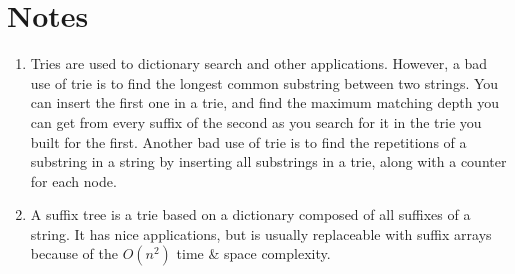 \documentclass[12pt]{book}
\begin{document}
\section{Notes}
\begin{enumerate}[label = \roman*.]
\item Tries are used to dictionary search and other applications. However, a bad use of trie is to find the longest common substring between two strings. You can insert the first one in a trie, and find the maximum matching depth you can get from every suffix of the second as you search for it in the trie you built for the first. Another bad use of trie is to find the repetitions of a substring in a string by inserting all substrings in a trie, along with a counter for each node.
\item A suffix tree is a trie based on a dictionary composed of all suffixes of a string. It has nice applications, but is usually replaceable with suffix arrays because of the $O(n^2)$ time \& space complexity.
\end{enumerate}
\end{document}
